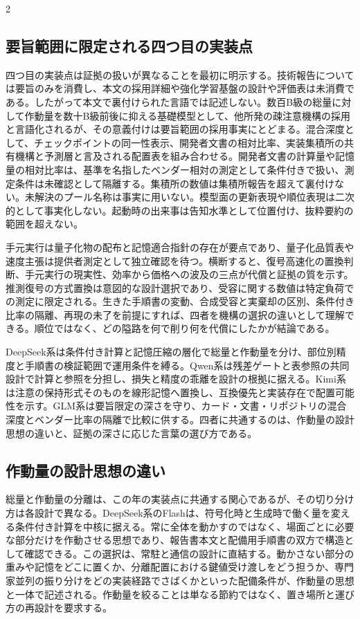 \documentclass[lualatex,a4paper,10pt]{jlreq}
\begin{document}
\begin{multicols}{2}
\subsection{要旨範囲に限定される四つ目の実装点}
四つ目の実装点は証拠の扱いが異なることを最初に明示する。技術報告については要旨のみを消費し、本文の採用詳細や強化学習基盤の設計や評価表は未消費である\autocite{glm5report}。したがって本文で裏付けられた言語では記述しない。数百B級の総量に対して作動量を数十B級前後に抑える基礎模型として、他所発の疎注意機構の採用と言語化されるが、その意義付けは要旨範囲の採用事実にとどまる。混合深度として、チェックポイントの同一性表示\autocite{glm53card}、開発者文書の相対比率\autocite{zaidocs}、実装集積所の共有機構と予測層と言及される配置表を組み合わせる\autocite{glm5github}。開発者文書の計算量や記憶量の相対比率は、基準を名指したベンダー相対の測定として条件付きで扱い、測定条件は未確認として隔離する。集積所の数値は集積所報告を超えて裏付けない。未解決のプール名称は事実に用いない。模型面の更新表現や順位表現は二次的として事実化しない。起動時の出来事は告知水準として位置付け、抜粋要約の範囲を超えない\autocite{dsadebut}。

手元実行は量子化物の配布と記憶適合指針の存在が要点であり\autocite{unslothglm}、量子化品質表や速度主張は提供者測定として独立確認を待つ。横断すると、復号高速化の置換判断、手元実行の現実性、効率から価格への波及の三点が代償と証拠の質を示す。推測復号の方式置換は意図的な設計選択であり、受容に関する数値は特定負荷での測定に限定される\autocite{dspark}。生きた手順書の変動、合成受容と実棄却の区別、条件付き比率の隔離、再現の未了を前提にすれば、四者を機構の選択の違いとして理解できる。順位ではなく、どの隘路を何で削り何を代償にしたかが結論である。

\begin{themeoverview}[四つの実装の要点対照]
DeepSeek系は条件付き計算と記憶圧縮の層化で総量と作動量を分け、部位別精度と手順書の検証範囲で運用条件を縛る。Qwen系は残差ゲートと表参照の共同設計で計算と参照を分担し、損失と精度の乖離を設計の根拠に据える。Kimi系は注意の保持形式そのものを線形記憶へ置換し、互換優先と実装存在で配置可能性を示す。GLM系は要旨限定の深さを守り、カード・文書・リポジトリの混合深度とベンダー比率の隔離で比較に供する。四者に共通するのは、作動量の設計思想の違いと、証拠の深さに応じた言葉の選び方である。
\end{themeoverview}

\subsection{作動量の設計思想の違い}
総量と作動量の分離は、この年の実装点に共通する関心であるが、その切り分け方は各設計で異なる。DeepSeek系のFlashは、符号化時と生成時で働く量を変える条件付き計算を中核に据える\autocite{v41report}\autocite{v41card}\autocite{vllmrecipe}。常に全体を動かすのではなく、場面ごとに必要な部分だけを作動させる思想であり、報告書本文と配備用手順書の双方で構造として確認できる。この選択は、常駐と通信の設計に直結する。動かさない部分の重みや記憶をどこに置くか、分離配置における鍵値受け渡しをどう担うか、専門家並列の振り分けをどの実装経路でさばくかといった配備条件が、作動量の思想と一体で記述される\autocite{dynamo}\autocite{vllmrecipe}\autocite{vllmv41}。作動量を絞ることは単なる節約ではなく、置き場所と運び方の再設計を要求する。


\end{multicols}
\end{document}
